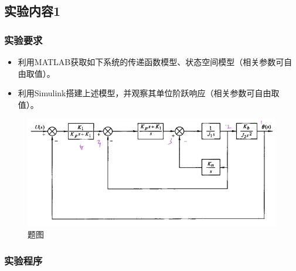 \documentclass[UTF8]{article}
\begin{document}
\subsection{实验内容1}
\subsubsection{实验要求}

\begin{itemize}
    \item 利用MATLAB获取如下系统的传递函数模型、状态空间模型（相关参数可自由取值）。
    \item 利用Simulink搭建上述模型，并观察其单位阶跃响应（相关参数可自由取值）。
\end{itemize}
\begin{figure}[H]
    \centering %
    \includegraphics[width=.8\textwidth]{figure/exp1_1.png} 
    \caption{题图} %
\end{figure}


\subsubsection{实验程序}
\end{document}

